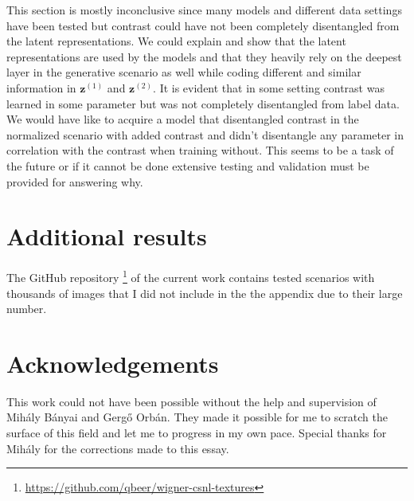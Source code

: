\documentclass[12pt, english]{article}
\begin{document}
\vspace{4mm}

\par This section is mostly inconclusive since many models and different data settings have been tested but contrast could have not been completely disentangled from the latent representations. We could explain and show that the latent representations are used by the models and that they heavily rely on the deepest layer in the generative scenario as well while coding different and similar information in $\bm{z}^{(1)}$ and $\bm{z}^{(2)}$. It is evident that in some setting contrast was learned in some parameter but was not completely disentangled from label data. We would have like to acquire a model that disentangled contrast in the normalized scenario with added contrast and didn't disentangle any parameter in correlation with the contrast when training without. This seems to be a task of the future or if it cannot be done extensive testing and validation must be provided for answering why.

\vspace{7mm}

\section{Additional results}

\vspace{7mm}

\par The GitHub repository \footnote{\url{https://github.com/qbeer/wigner-csnl-textures}} of the current work contains tested scenarios with thousands of images that I did not include in the the appendix due to their large number. 

\vspace{7mm}

\section{Acknowledgements}

\vspace{7mm}

\par This work could not have been possible without the help and supervision of Mihály Bányai and Gergő Orbán. They made it possible for me to scratch the surface of this field and let me to progress in my own pace. Special thanks for Mihály for the corrections made to this essay.

\newpage
\end{document}
